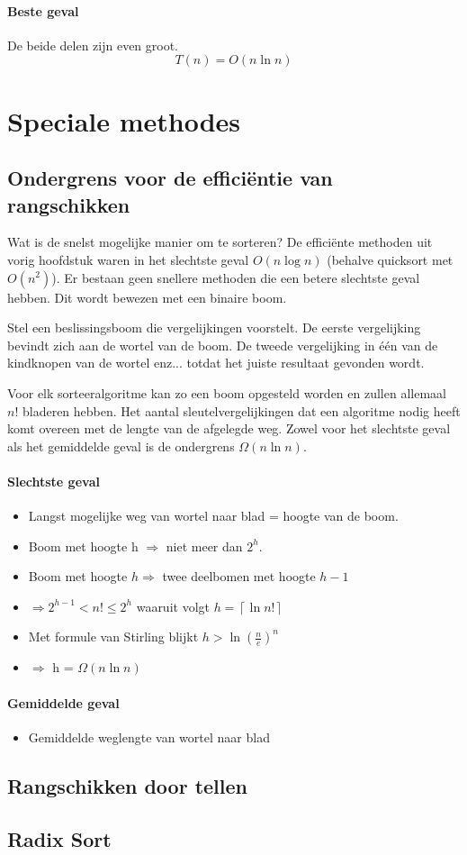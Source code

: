 \documentclass[12pt]{report}
\def\lc{\left\lceil}
\def\rc{\right\rceil}
\begin{document}
\subsubsection{Beste geval}
De beide delen zijn even groot.
$$T(n) = O(n \ln n)$$



\chapter{Speciale methodes}
\section{Ondergrens voor de efficiëntie van rangschikken}
Wat is de snelst mogelijke manier om te sorteren? De efficiënte methoden uit vorig hoofdstuk waren in het slechtste geval $O(n \log n)$ (behalve quicksort met $O(n^2)$). Er bestaan geen snellere methoden die een betere slechtste geval hebben. Dit wordt bewezen met een binaire boom.

Stel een beslissingsboom die vergelijkingen voorstelt. De eerste vergelijking bevindt zich aan de wortel van de boom. De tweede vergelijking in één van de kindknopen van de wortel enz... totdat het juiste resultaat gevonden wordt.

Voor elk sorteeralgoritme kan zo een boom opgesteld worden en zullen allemaal $n!$ bladeren hebben. Het aantal sleutelvergelijkingen dat een algoritme nodig heeft komt overeen met de lengte van de afgelegde weg. Zowel voor het slechtste geval als het gemiddelde geval is de ondergrens $\Omega(n \ln n)$.
\subsubsection{Slechtste geval}
\begin{itemize}
 \item Langst mogelijke weg van wortel naar blad = hoogte van de boom.
 \item Boom met hoogte h $\Rightarrow$ niet meer dan $2^h$.
 \item Boom met hoogte $h \Rightarrow$ twee deelbomen met hoogte $h - 1$
 \item $\Rightarrow 2^{h - 1} < n! \leq 2^h$ waaruit volgt $h = \lc \ln n! \rc$
 \item Met formule van Stirling blijkt $h > \ln (\frac{n}{e})^n$
 \item $\Rightarrow$ h = $\Omega(n \ln n)$
\end{itemize}
\subsubsection{Gemiddelde geval}
\begin{itemize}
 \item Gemiddelde weglengte van wortel naar blad
 
\end{itemize}

\section{Rangschikken door tellen}

\section{Radix Sort}
\end{document}
